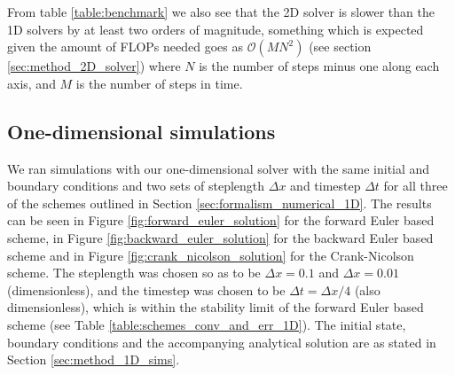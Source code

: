 \documentclass[reprint,english,notitlepage]{revtex4-1}  %
\begin{document}
From table \ref{table:benchmark} we also see that the 2D solver is slower than the 1D solvers by at least two orders of magnitude, something which is expected given the amount of FLOPs needed goes as \(\mathcal{O}(MN^{2})\) (see section \ref{sec:method_2D_solver}) where \(N\) is the number of steps minus one along each axis, and \(M\) is the number of steps in time.


\subsection{One-dimensional simulations} \label{sec:discussion_1D}

We ran simulations with our one-dimensional solver with the same initial and boundary conditions and two sets of steplength $\Delta x$ and timestep $\Delta t$ for all three of the schemes outlined in Section \ref{sec:formalism_numerical_1D}. The results can be seen in Figure \ref{fig:forward_euler_solution} for the forward Euler based scheme, in Figure \ref{fig:backward_euler_solution} for the backward Euler based scheme and in Figure \ref{fig:crank_nicolson_solution} for the Crank-Nicolson scheme. The steplength was chosen so as to be $\Delta x = 0.1$ and $\Delta x = 0.01$ (dimensionless), and the timestep was chosen to be $\Delta t = \Delta x/4$ (also dimensionless), which is within the stability limit of the forward Euler based scheme (see Table \ref{table:schemes_conv_and_err_1D}). The initial state, boundary conditions and the accompanying analytical solution are as stated in Section \ref{sec:method_1D_sims}.
\end{document}

